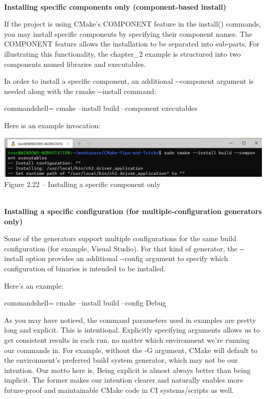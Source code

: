 \hspace*{\fill} \\ %
\noindent
\textbf{Installing specific components only (component-based install)}

If the project is using CMake's COMPONENT feature in the install() commands, you may install specific components by specifying their component names. The COMPONENT feature allows the installation to be separated into sub-parts. For illustrating this functionality, the chapter\_2 example is structured into two components named libraries and executables.

In order to install a specific component, an additional -{}-component argument is needed along with the cmake -{}-install command:

\begin{tcblisting}{commandshell={}}
cmake --install build --component executables
\end{tcblisting}

Here is an example invocation:

\begin{center}
\includegraphics[width=1.\textwidth]{content/1/chapter2/images/22.jpg}\\
Figure 2.22 – Installing a specific component only
\end{center}

\hspace*{\fill} \\ %
\noindent
\textbf{Installing a specific configuration (for multiple-configuration 	generators only)}

Some of the generators support multiple configurations for the same build configuration (for example, Visual Studio). For that kind of generator, the -{}-install option provides an additional -{}-config argument to specify which configuration of binaries is intended to be installed.

Here's an example:

\begin{tcblisting}{commandshell={}}
cmake --install build --config Debug
\end{tcblisting}

\begin{tcolorbox}[colback=webgreen!5!white,colframe=webgreen!75!black,title=Note]
As you may have noticed, the command parameters used in examples are pretty long and explicit. This is intentional. Explicitly specifying arguments allows us to get consistent results in each run, no matter which environment we're running our commands in. For example, without the -G argument, CMake will default to the environment's preferred build system generator, which may not be our intention. Our motto here is, Being explicit is almost always better than being implicit. The former makes our intention clearer and naturally enables more future-proof and maintainable CMake code in CI systems/scripts as well.
\end{tcolorbox}

